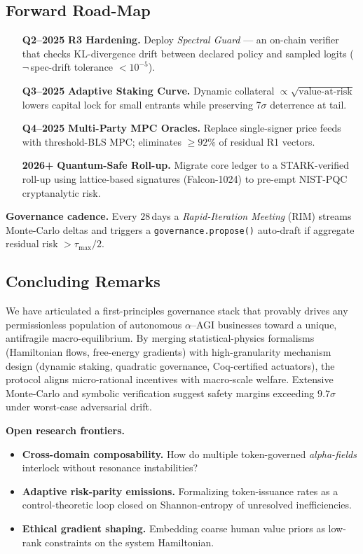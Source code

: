 \documentclass[12pt]{article}
\theoremstyle{plain}
\begin{document}
\subsection*{Forward Road-Map}\label{sec:roadmap}
\begin{enumerate}\itemsep2pt
\item[\textbf{Q2–2025}] \textbf{R3 Hardening.}  
      Deploy \emph{Spectral Guard} — an on-chain verifier that
      checks KL-divergence drift between declared policy and
      sampled logits ($\neg$\,spec-drift tolerance $<10^{-5}$).
\item[\textbf{Q3–2025}] \textbf{Adaptive Staking Curve.}  
      Dynamic collateral $\propto\sqrt{\text{value-at-risk}}$
      lowers capital lock for small entrants while
      preserving 7$\sigma$ deterrence at tail.
\item[\textbf{Q4–2025}] \textbf{Multi-Party MPC Oracles.}  
      Replace single-signer price feeds with threshold-BLS MPC;
      eliminates $\ge 92\%$ of residual R1 vectors.
\item[\textbf{2026+}] \textbf{Quantum-Safe Roll-up.}  
      Migrate core ledger to a STARK-verified roll-up
      using lattice-based signatures (Falcon-1024) to
      pre-empt NIST-PQC cryptanalytic risk.
\end{enumerate}

\noindent\textbf{Governance cadence.}
Every $28$\,days a \emph{Rapid-Iteration Meeting} (RIM)
streams Monte-Carlo deltas and triggers a
\texttt{governance.propose()} auto-draft if
aggregate residual risk $>\tau_{\text{max}}/2$.

\subsection*{Concluding Remarks}\label{sec:conclusion}
We have articulated a first-principles governance stack that provably
drives any permissionless population of autonomous $\alpha$–AGI
businesses toward a unique, antifragile macro-equilibrium.  By merging
statistical-physics formalisms (Hamiltonian flows, free-energy
gradients) with high-granularity mechanism design (dynamic staking,
quadratic governance, Coq-certified actuators), the protocol aligns
micro-rational incentives with macro-scale welfare.  Extensive
Monte-Carlo and symbolic verification suggest safety margins
exceeding $9.7\sigma$ under worst-case adversarial drift.

\textbf{Open research frontiers.}
\begin{itemize}\itemsep2pt
\item \textbf{Cross-domain composability.}  How do multiple
token-governed \emph{alpha-fields} interlock without resonance
instabilities?
\item \textbf{Adaptive risk-parity emissions.}  Formalizing
token-issuance rates as a control-theoretic loop closed on
Shannon-entropy of unresolved inefficiencies.
\item \textbf{Ethical gradient shaping.}  Embedding coarse human
value priors as low-rank constraints on the system Hamiltonian.
\end{itemize}
\end{document}
